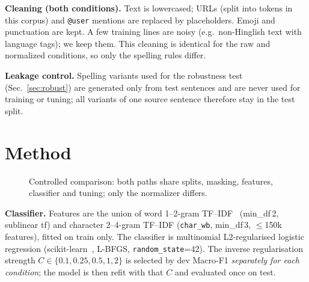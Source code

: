 \documentclass[10pt,twocolumn,letterpaper]{article}
\begin{document}
\textbf{Cleaning (both conditions).} Text is lowercased; URLs (split into tokens in this corpus) and \texttt{@user} mentions are replaced by placeholders. Emoji and punctuation are kept. A few training lines are noisy (e.g.\ non-Hinglish text with language tags); we keep them. This cleaning is identical for the raw and normalized conditions, so only the spelling rules differ.

\textbf{Leakage control.} Spelling variants used for the robustness test (Sec.~\ref{sec:robust}) are generated only from test sentences and are never used for training or tuning; all variants of one source sentence therefore stay in the test split.

\section{Method}
\label{sec:method}
\begin{figure}[t]\centering
{}
\caption{Controlled comparison: both paths share splits, masking, features, classifier and tuning; only the normalizer differs.}\label{fig:pipe}
\end{figure}

\textbf{Classifier.} Features are the union of word 1--2-gram TF--IDF~\cite{sparckjones1972statistical} (min\_df\,2, sublinear tf) and character 2--4-gram TF--IDF (\texttt{char\_wb}, min\_df\,3, $\le$150k features), fitted on train only. The classifier is multinomial L2-regularised logistic regression (scikit-learn~\cite{pedregosa2011scikit}, L-BFGS, \texttt{random\_state}=42). The inverse regularisation strength $C\in\{0.1,0.25,0.5,1,2\}$ is selected by dev Macro-F1 \emph{separately for each condition}; the model is then refit with that $C$ and evaluated once on test.
\end{document}
